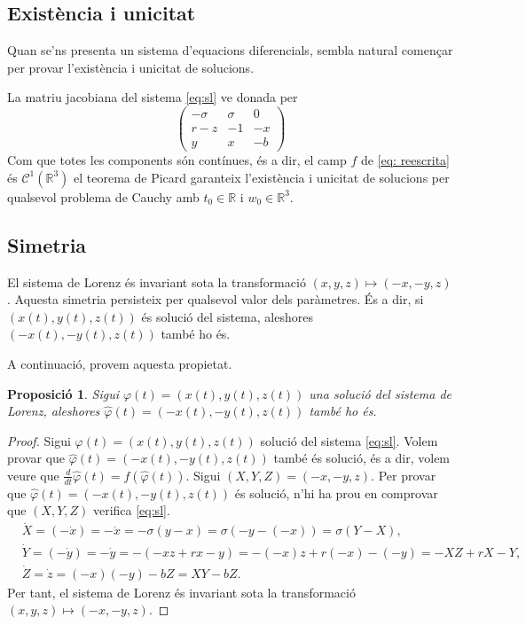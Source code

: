 \documentclass[11pt,a4paper,openright,oneside]{article}
\numberwithin{equation}{section}
\newtheorem{prop}[teo]{Proposici\'o}
\theoremstyle{definition}
\begin{document}
\subsection{Existència i unicitat}
Quan se'ns presenta un sistema d'equacions diferencials, sembla natural començar per provar l'existència i unicitat de solucions.

La matriu jacobiana del sistema \eqref{eq:sl} ve donada per 
\begin{equation}\begin{pmatrix} \label{eq: Jacobiana}
    -\sigma & \sigma & 0\\
    r-z & -1 & -x\\
    y & x & -b
\end{pmatrix}\end{equation}
Com que totes les components són contínues, és a dir, el camp $f$ de \eqref{eq: reescrita} és $\mathcal{C}^{1}(\mathbb{R}^{3})$ el teorema de Picard garanteix l'existència i unicitat de solucions per qualsevol problema de Cauchy amb $t_0 \in \mathbb{R}$ i $w_0 \in \mathbb{R}^{3}$. 

\subsection{Simetria}
El sistema de Lorenz és invariant sota la transformació $(x,y,z)\mapsto(-x,-y,z)$. Aquesta simetria persisteix per qualsevol valor dels paràmetres. És a dir, si $\left(x(t),y(t),z(t)\right)$ és solució del sistema, aleshores $\left(-x(t),-y(t),z(t)\right)$ també ho és. 

A continuació, provem aquesta propietat.

\begin{prop}
    Sigui $\varphi(t)=\left(x(t), y(t), z(t)\right)$ una solució del sistema de Lorenz, aleshores $\hat{\varphi}(t)=(-x(t),-y(t),z(t))$ també ho és. 
\end{prop} 

\begin{proof}
    Sigui $\varphi(t)=(x(t),y(t),z(t))$ solució del sistema \eqref{eq:sl}. Volem provar que $\hat{\varphi}(t)=\left(-x(t),-y(t),z(t)\right)$ també és solució, és a dir, volem veure que $\frac{d}{dt}\hat{\varphi}(t)=f\left(\hat{\varphi}(t)\right)$. Sigui $\left(X,Y,Z\right)=(-x,-y,z)$. Per provar que $\hat{\varphi}(t)=(-x(t),-y(t),z(t))$ és solució, n'hi ha prou en comprovar que $(X,Y,Z)$ verifica \eqref{eq:sl}.   \begin{align*} 
        &\dot{X}=(-\dot{x})=-\dot{x}=-\sigma\left(y-x\right)=\sigma(-y-(-x))=\sigma\left(Y-X\right),\\ &\dot{Y}=(-\dot{y})=-\dot{y}=-(-xz+rx-y)=-(-x)z+r(-x)-(-y)=-XZ+rX-Y, \\ &\dot{Z}=\dot{z}=(-x)(-y)-bZ=XY-bZ.
    \end{align*}
    Per tant, el sistema de Lorenz és invariant sota la transformació $(x,y,z)\mapsto(-x,-y,z)$. 
\end{proof}
\end{document}
